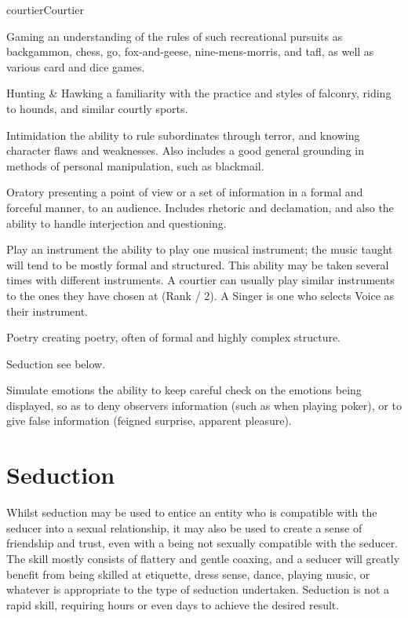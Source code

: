 \begin{Skill}[2.1]{courtier}{Courtier}
\begin{Description}
\item[Gaming] an understanding of the rules of such recreational
  pursuits as backgammon, chess, go, fox-and-geese, nine-mens-morris,
  and tafl, as well as various card and dice games.

\item[Hunting \& Hawking] a familiarity with the practice and styles
  of falconry, riding to hounds, and similar courtly sports.

\item[Intimidation] the ability to rule subordinates through terror,
  and knowing character flaws and weaknesses. Also includes a good
  general grounding in methods of personal manipulation, such as
  blackmail.

\item[Oratory] presenting a point of view or a set of information in a
  formal and forceful manner, to an audience.  Includes rhetoric and
  declamation, and also the ability to handle interjection and
  questioning.

\item[Play an instrument] the ability to play one musical instrument;
  the music taught will tend to be mostly formal and structured.  This
  ability may be taken several times with different instruments. A
  courtier can usually play similar instruments to the ones they have
  chosen at (Rank / 2).  A Singer is one who selects Voice as their
  instrument.

\item[Poetry] creating poetry, often of formal and highly complex
  structure.

\item[Seduction] see below. 

\item[Simulate emotions] the ability to keep careful check on the
  emotions being displayed, so as to deny observers information (such
  as when playing poker), or to give false information (feigned
  surprise, apparent pleasure).

\end{Description}

\section{Seduction}

Whilst seduction may be used to entice an entity who is compatible
with the seducer into a sexual relationship, it may also be used to
create a sense of friendship and trust, even with a being not sexually
compatible with the seducer.  The skill mostly consists of flattery
and gentle coaxing, and a seducer will greatly benefit from being
skilled at etiquette, dress sense, dance, playing music, or whatever
is appropriate to the type of seduction undertaken. Seduction is not a
rapid skill, requiring hours or even days to achieve the desired
result.


\end{Skill}

